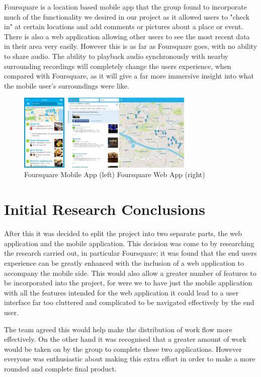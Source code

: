 \documentclass{l3proj}
\begin{document}
Foursquare is a location based mobile app that the group found to incorporate much of the functionality we desired in our project as it allowed users to "check in" at certain locations and add comments or pictures about a place or event. There is also a web application allowing other users to see the most recent data in their area very easily. However this is as far as Foursquare goes, with no ability to share audio. The ability to playback audio synchronously with nearby surrounding recordings will completely change the users experience, when compared with Foursquare, as it will give a far more immersive insight into what the mobile user's surroundings were like.

\begin{figure}[ht!]
  \centering
\includegraphics[width=0.75\textwidth]{images/foursquare.jpg}
\caption{Foursquare Mobile App (left) Foursquare Web App (right)}
\end{figure}

\section{Initial Research Conclusions}

After this it was decided to split the project into two separate parts, the web application and the mobile application. This decision was come to by researching the research carried out, in particular Foursquare; it was found that the end users experience can be greatly enhanced with the inclusion of a web application to accompany the mobile side. This would also allow a greater number of features to be incorporated into the project, for were we to have just the mobile application with all the features intended for the web application it could lead to a user interface far too cluttered and complicated to be navigated effectively by the end user.

The team agreed this would help make the distribution of work flow more effectively. On the other hand it was recognised that a greater amount of work would be taken on by the group to complete these two applications. However everyone was enthusiastic about making this extra effort in order to make a more rounded and complete final product.
\end{document}

